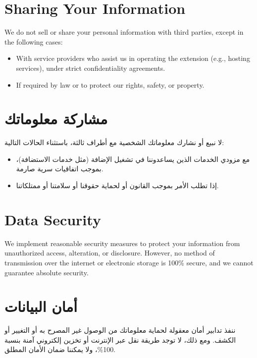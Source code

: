 \documentclass[12pt]{article}
\begin{document}
\section{Sharing Your Information}
We do not sell or share your personal information with third parties, except in the following cases:
\begin{itemize}
    \item With service providers who assist us in operating the extension (e.g., hosting services), under strict confidentiality agreements.
    \item If required by law or to protect our rights, safety, or property.
\end{itemize}

\section*{\textarabic{مشاركة معلوماتك}}
\textarabic{لا نبيع أو نشارك معلوماتك الشخصية مع أطراف ثالثة، باستثناء الحالات التالية:}
\begin{itemize}[label=\textarabic{•}]
    \item \textarabic{مع مزودي الخدمات الذين يساعدوننا في تشغيل الإضافة (مثل خدمات الاستضافة)، بموجب اتفاقيات سرية صارمة.}
    \item \textarabic{إذا تطلب الأمر بموجب القانون أو لحماية حقوقنا أو سلامتنا أو ممتلكاتنا.}
\end{itemize}

\section{Data Security}
We implement reasonable security measures to protect your information from unauthorized access, alteration, or disclosure. However, no method of transmission over the internet or electronic storage is 100\% secure, and we cannot guarantee absolute security.

\section*{\textarabic{أمان البيانات}}
\textarabic{ننفذ تدابير أمان معقولة لحماية معلوماتك من الوصول غير المصرح به أو التغيير أو الكشف. ومع ذلك، لا توجد طريقة نقل عبر الإنترنت أو تخزين إلكتروني آمنة بنسبة 100\%، ولا يمكننا ضمان الأمان المطلق.}

\end{document}
